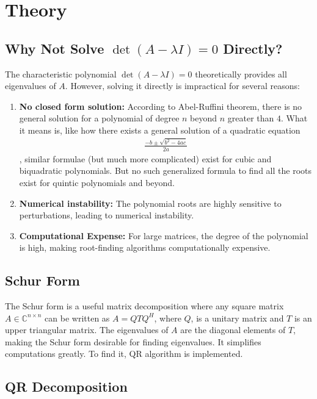 \documentclass[12pt]{article}
\begin{document}
\section{Theory}

\subsection{Why Not Solve $\det(A - \lambda I) = 0 $ Directly?}
The characteristic polynomial $\det(A - \lambda I) = 0$ theoretically provides all eigenvalues of $A$. However, solving it directly is impractical for several reasons:
\begin{enumerate}
    \item \textbf{No closed form solution: } According to Abel-Ruffini theorem, there is no general solution for a polynomial of degree $n$ beyond $n$ greater than $4$. What it means is, like how there exists a general solution of a quadratic equation 
    \begin{align*}
    \frac{-b \pm \sqrt{b^2-4ac}}{2a}
    \end{align*}
    , similar formulae (but much more complicated) exist for cubic and biquadratic polynomials. But no such generalized formula to find all the roots exist for quintic polynomials and beyond.
    \item \textbf{Numerical instability:} The polynomial roots are highly sensitive to perturbations, leading to numerical instability.
    \item \textbf{Computational Expense:} For large matrices, the degree of the polynomial is high, making root-finding algorithms computationally expensive.
\end{enumerate}
\subsection{Schur Form}

The Schur form is a useful matrix decomposition where any square matrix $A \in \mathbb{C}^{n \times n}$ can be written as $ A = Q T Q^H $, where $Q$, is a unitary matrix and $T$ is an upper triangular matrix. The eigenvalues of $A$ are the diagonal elements of $T$, making the Schur form desirable for finding eigenvalues. It simplifies computations greatly. To find it, QR algorithm is implemented.

\subsection{QR Decomposition}
\end{document}
